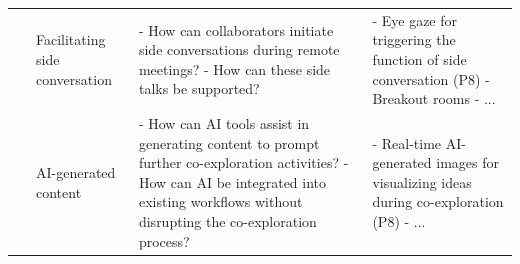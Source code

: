 \documentclass[11pt]{article}
\begin{document}
\begin{table}[ht]
\begin{tabular}{|l|p{3.2cm}|p{4.5cm}|p{4.5cm}|}
{~} & Facilitating side conversation 
& - How can collaborators initiate side conversations during remote meetings? \newline
- How can these side talks be supported?
& - Eye gaze for triggering the function of side conversation (P8) \newline
- Breakout rooms \newline
- ... \newline {~}\\


{~} & AI-generated content 
& - How can AI tools assist in generating content to prompt further co-exploration activities? \newline
- How can AI be integrated into existing workflows without disrupting the co-exploration process? \newline {~}
& - Real-time AI-generated images for visualizing ideas during co-exploration (P8) \newline
- ... \newline {~}\\
\hline

\end{tabular}
\end{table}
\end{document}
